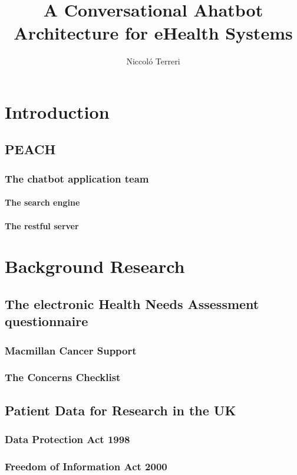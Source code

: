 \documentclass[12pt, twoside, a4paper, draft]{report}
\author{Niccol\'o Terreri}
\title{A Conversational Ahatbot Architecture for eHealth Systems}
\begin{document}
\maketitle
\tableofcontents

\chapter{Introduction}
\section{PEACH}
\subsection{The chatbot application team}
\subsubsection{The search engine}
\subsubsection{The restful server}

\chapter{Background Research}
\section{The electronic Health Needs Assessment questionnaire}
\subsection{Macmillan Cancer Support}
\subsection{The Concerns Checklist}
\section{Patient Data for Research in the UK}
\subsection{Data Protection Act 1998}
\subsection{Freedom of Information Act 2000}
\end{document}
